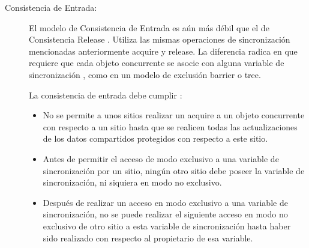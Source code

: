 \begin{description}
\item[Consistencia de Entrada: ]
El modelo de Consistencia de Entrada es aún más débil que el de Consistencia Release \cite{bershad:1991}. Utiliza las mismas operaciones de sincronización mencionadas anteriormente acquire y release. La diferencia radica en que requiere que cada objeto concurrente se asocie con alguna variable de sincronización \cite{mosberger:1993}, como en un modelo de exclusión barrier o tree.

La consistencia de entrada debe cumplir \cite{bershad:1991}:
\begin{itemize}
\item No se permite a unos sitios realizar un acquire a un objeto concurrente con respecto a un sitio hasta que se realicen todas las actualizaciones de los datos compartidos protegidos con respecto a este sitio.
\item Antes de permitir el acceso de modo exclusivo a una variable de sincronización por un sitio, ningún otro sitio debe poseer la variable de sincronización, ni siquiera en modo no exclusivo.
\item Después de realizar un acceso en modo exclusivo a una variable de sincronización, no se puede realizar el siguiente acceso en modo no exclusivo de otro sitio a esta variable de sincronización hasta haber sido realizado con respecto al propietario de esa variable.
\end{itemize}

\end{description}

